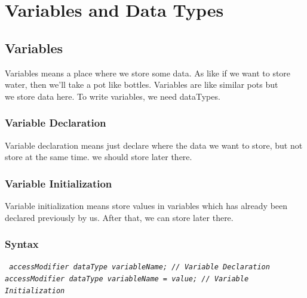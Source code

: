 \documentclass[openany]{book}  %
\begin{document}
\chapter{Variables and Data Types}
% 
% 
\section{Variables}
Variables means a place where we store some data. As like if we want to store \\
water, then we'll take a pot like bottles. Variables are like similar pots but \\
we store data here. To write variables, we need dataTypes.
% 
%
\subsection{Variable Declaration}
Variable declaration means just declare where the data we want to store, but not store at the same time. we should store later there.
% 
%
\subsection{Variable Initialization}
Variable initialization means store values in variables which has already been \\
declared previously by us. After that, we can store later there.
% 
%
\subsection{Syntax}
\begin{center}
    \tt{
        \textit{accessModifier dataType variableName; // Variable Declaration}\\
        \null\textit{accessModifier dataType variableName = value; // Variable Initialization}
    }
\end{center}
% 
%
\end{document}
